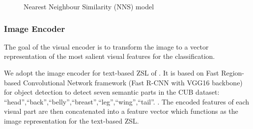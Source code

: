 \documentclass[11pt,a4paper]{article}
\newcommand\gal[1]{\textcolor{bright}{\textbf{GAL:} #1 }}
\begin{document}





\begin{figure}[t]
\centering
{}
 \caption{Nearest Neighbour Similarity (NNS) model}
\label{fig:DS}
\end{figure}

\subsubsection{Image Encoder}
\label{section:Image_Encoder}
The goal of the visual encoder is to transform the image to a vector representation of the most salient visual features for the classification. 

We adopt the image encoder for text-based ZSL of \citet{zhang2016spda, zhu2018generative,elhoseiny2017link}. It is based on Fast Region-based Convolutional Network framework (Fast R-CNN with VGG16 backbone) for object detection \citep{girshick2015fast} to detect seven semantic parts in the CUB dataset:
\enquote{head},\enquote{back},\enquote{belly},\enquote{breast},\enquote{leg},\enquote{wing},\enquote{tail}. 
. The encoded features of each visual part are then concatenated into a feature vector which functions as the image representation for the text-based ZSL.


\end{document}
